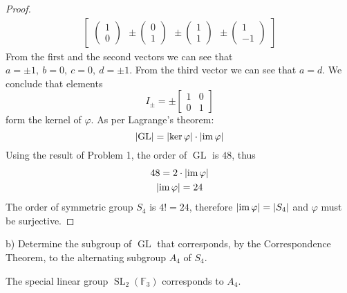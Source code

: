 \documentclass{article}
\theoremstyle{definition}
\DeclareMathOperator{\im}{\operatorname{im}}
\newcommand{\F}{\mathbb{F}}
\newcommand{\GL}{\operatorname{GL}}
\newcommand{\SL}{\operatorname{SL}}
\DeclarePairedDelimiter\abs{\lvert}{\rvert}
\begin{document}
\begin{proof}
\begin{multline*}
\begin{bmatrix}
\begin{pmatrix}
            1 \\ 0
        \end{pmatrix} \>\>
        \pm \begin{pmatrix}
            0 \\ 1
        \end{pmatrix} \>\>
        \pm \begin{pmatrix}
            1 \\ 1
        \end{pmatrix} \>\>
        \pm \begin{pmatrix}
            1 \\ -1
        \end{pmatrix}
    \end{bmatrix}
\end{multline*}
From the first and the second vectors we can see that $a = \pm 1, \> b = 0, \> c = 0, \> d = \pm 1$. From the third vector we can see that $a = d$. We conclude that elements
\[
    I_\pm = 
    \pm \begin{bmatrix}
    1 & 0 \\
    0 & 1
    \end{bmatrix}
\]
form the kernel of $\varphi$.
As per Lagrange's theorem:
\[ \abs{\GL} = \abs{\ker \varphi} \cdot \abs{\im \varphi} \]
Using the result of Problem 1, the order of $\GL$ is $48$, thus
\begin{gather*}
    48 = 2 \cdot \abs{\im \varphi} \\    
    \abs{\im \varphi} = 24
\end{gather*}
The order of symmetric group $S_4$ is $4! = 24$, therefore $\abs{\im \varphi} = \abs{S_4}$ and $\varphi$ must be surjective.

\end{proof}

\begin{tcolorbox}
b) Determine the subgroup of $\GL$ that corresponds, by the Correspondence Theorem, to the alternating subgroup $A_4$ of $S_4$.
\end{tcolorbox}

The special linear group $\SL_2(\F_3)$ corresponds to $A_4$.
\end{document}
